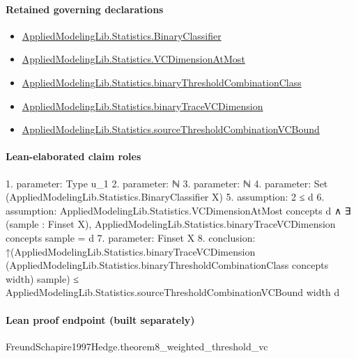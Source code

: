 \documentclass[10pt]{article}
\begin{document}
\paragraph{Retained governing declarations}
\begin{itemize}\raggedright
\item \hyperlink{governing-declaration-cb3af244ff388b59}{Applied\allowbreak{}Modeling\allowbreak{}Lib.\allowbreak{}Statistics.\allowbreak{}Binary\allowbreak{}Classifier}
\item \hyperlink{governing-declaration-bef3cff7f5ca4668}{Applied\allowbreak{}Modeling\allowbreak{}Lib.\allowbreak{}Statistics.\allowbreak{}VC\allowbreak{}Dimension\allowbreak{}At\allowbreak{}Most}
\item \hyperlink{governing-declaration-09452fac19809392}{Applied\allowbreak{}Modeling\allowbreak{}Lib.\allowbreak{}Statistics.\allowbreak{}binary\allowbreak{}Threshold\allowbreak{}Combination\allowbreak{}Class}
\item \hyperlink{governing-declaration-cbc482e454b32826}{Applied\allowbreak{}Modeling\allowbreak{}Lib.\allowbreak{}Statistics.\allowbreak{}binary\allowbreak{}Trace\allowbreak{}VC\allowbreak{}Dimension}
\item \hyperlink{governing-declaration-cc9115a5a9196330}{Applied\allowbreak{}Modeling\allowbreak{}Lib.\allowbreak{}Statistics.\allowbreak{}source\allowbreak{}Threshold\allowbreak{}Combination\allowbreak{}VC\allowbreak{}Bound}
\end{itemize}
\paragraph{Lean-elaborated claim roles}\begin{ReviewVerbatim}
1. parameter: Type u_1
2. parameter: ℕ
3. parameter: ℕ
4. parameter: Set (AppliedModelingLib.Statistics.BinaryClassifier X)
5. assumption: 2 ≤ d
6. assumption: AppliedModelingLib.Statistics.VCDimensionAtMost concepts d ∧
  ∃ (sample : Finset X), AppliedModelingLib.Statistics.binaryTraceVCDimension concepts sample = d
7. parameter: Finset X
8. conclusion: ↑(AppliedModelingLib.Statistics.binaryTraceVCDimension
      (AppliedModelingLib.Statistics.binaryThresholdCombinationClass concepts width) sample) ≤
  AppliedModelingLib.Statistics.sourceThresholdCombinationVCBound width d
\end{ReviewVerbatim}

\paragraph{Lean proof endpoint (built separately)}\begin{ReviewVerbatim}
FreundSchapire1997Hedge.theorem8_weighted_threshold_vc
\end{ReviewVerbatim}
\end{document}
